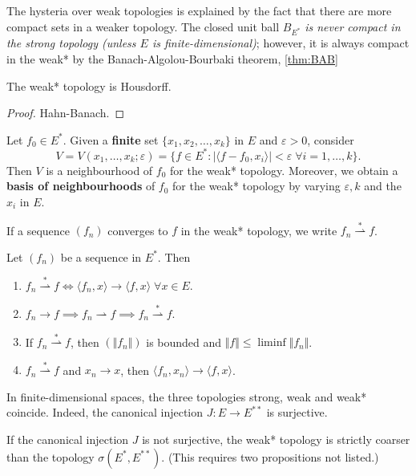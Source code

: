 \documentclass{article}
\theoremstyle{definition}
\numberwithin{equation}{section}
\begin{document}
\begin{remark}
	The hysteria over weak topologies is explained by the fact that there are more compact sets in a weaker topology. The closed unit ball $B_{E^*}$ \textit{is never compact in the strong topology (unless $E$ is finite-dimensional)}; however, it is always compact in the weak* by the Banach-Algolou-Bourbaki theorem, \cref{thm:BAB}
\end{remark}

\begin{prop}
	The weak* topology is Housdorff.
\end{prop}
\begin{proof}
	Hahn-Banach.
\end{proof}
\begin{prop}
	Let $f_0\in E^*$. Given a \textbf{finite} set $\{x_1,x_2,\ldots,x_k\}$ in $E$ and $\varepsilon>0$, consider
	\[V=V(x_1,\ldots,x_k;\varepsilon)=\{f\in E^*:|\langle f-f_0,x_i\rangle|<\varepsilon\;\forall i=1,\ldots,k\}.\]
	Then $V$ is a neighbourhood of $f_0$ for the weak* topology. Moreover, we obtain a \textbf{basis of neighbourhoods} of $f_0$ for the weak* topology by varying $\varepsilon,k$ and the $x_i$ in $E$.
\end{prop}
If a sequence $(f_n)$ converges to $f$ in the weak* topology, we write $f_n\overset{*}{\rightharpoonup}f$.
\begin{prop} Let $(f_n)$ be a sequence in $E^*$. Then
	\begin{enumerate}
		\item $f_n\overset{*}{\rightharpoonup}f \iff \langle f_n,x\rangle\to\langle f,x\rangle\;\forall x\in E$.
		\item $f_n\to f\implies f_n\rightharpoonup f\implies f_n\overset{*}{\rightharpoonup}f$.
		\item If $f_n\overset{*}{\rightharpoonup}f$, then $(\Vert f_n\Vert)$ is bounded and $\Vert f\Vert\leq\liminf\Vert f_n\Vert$.
		\item $f_n\overset{*}{\rightharpoonup}f$ and $x_n\to x$, then $\langle f_n,x_n\rangle\to\langle f,x\rangle$.
	\end{enumerate}
\end{prop}
\begin{remark}
	In finite-dimensional spaces, the three topologies strong, weak and weak* coincide. Indeed, the canonical injection $J:E\to E^{**}$ is surjective.
\end{remark}
\begin{remark}	
	If the canonical injection $J$ is not surjective, the weak* topology is strictly coarser than the topology $\sigma(E^*,E^{**})$. (This requires two propositions not listed.)
\end{remark}
\end{document}
